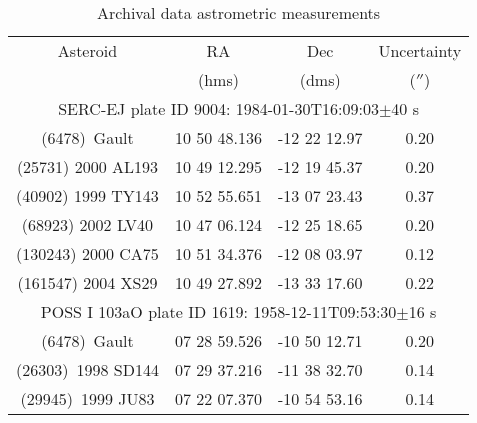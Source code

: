 \begin{table}
\caption{Archival data astrometric measurements}
\label{Tab:Ast_Meas}
\begin{tabular}{c c c c }
\hline
Asteroid & RA  & Dec & Uncertainty \\
 & (hms)  & (dms) & ($''$)\\
 \hline
\multicolumn{4}{c}{SERC-EJ plate ID 9004: 1984-01-30T16:09:03$\pm$40 s}  \\
\hline
(6478)~Gault  & 10 50 48.136  & -12 22 12.97 & 0.20\\
(25731) 2000 AL193 & 10 49 12.295 & -12 19 45.37 & 0.20\\
(40902) 1999 TY143 & 10 52 55.651 & -13 07 23.43 & 0.37 \\
(68923) 2002 LV40  & 10 47 06.124  & -12 25 18.65 & 0.20\\
(130243) 2000 CA75 & 10 51 34.376 & -12 08 03.97 & 0.12\\
(161547) 2004 XS29 & 10 49 27.892 & -13 33 17.60 & 0.22\\
\hline
\multicolumn{4}{c}{POSS I 103aO plate ID 1619: 1958-12-11T09:53:30$\pm$16 s } \\
\hline
(6478)~Gault & 07 28 59.526 & -10 50 12.71 & 0.20\\
(26303)~1998 SD144 & 07 29 37.216 & -11 38 32.70 & 0.14\\
(29945)~1999 JU83  & 07 22 07.370 & -10 54 53.16 & 0.14\\
\hline
\end{tabular}
\end{table}